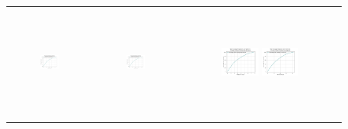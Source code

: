 \begin{figure}[p]
\begin{tabular}{ccc}
         \includegraphics[height=36mm,width=0.24\textwidth]{Images/simulation_no_obs/coverage_plots/31.png}
        & \includegraphics[height=36mm,width=0.24\textwidth]{Images/simulation_no_obs/coverage_plots/32.png}
        & \includegraphics[height=36mm,width=0.24\textwidth]{Images/simulation_no_obs/coverage_plots/33.png}
         \includegraphics[height=36mm,width=0.24\textwidth]{Images/simulation_no_obs/coverage_plots/34.png}\\[-4pt]



\end{tabular}
\end{figure}
